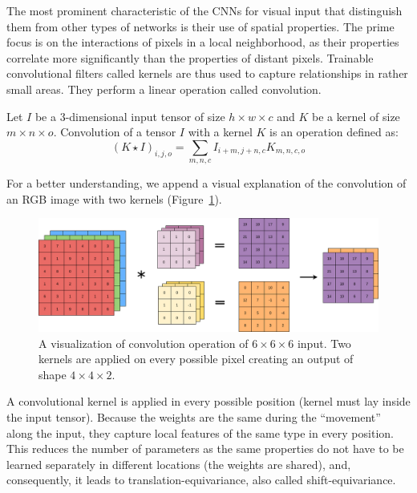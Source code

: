 The most prominent characteristic of the CNNs for visual input that distinguish them from other types of networks is their use of spatial properties. The prime focus is on the interactions of pixels in a local neighborhood, as their properties correlate more significantly than the properties of distant pixels. Trainable convolutional filters called kernels are thus used to capture relationships in rather small areas. They perform a linear operation called convolution.

\begin{defn}[Convolution]\label{def01:7}
	Let $I$ be a 3-dimensional input tensor of size $h \times w \times c$ and $K$ be a kernel of size $m \times n \times o$. Convolution of a tensor $I$ with a kernel $K$ is an operation defined as:
	\begin{equation}
		(K \star I)_{i, j, o} = \sum_{m, n, c} I_{i+m, j+n, c} K_{m, n, c, o}
	\end{equation}
\end{defn}

For a better understanding, we append a visual explanation of the convolution of an RGB image with two kernels (Figure~\ref{img02:conv}).

\begin{figure}[h]\centering
	\includegraphics[width=140mm]{../img/convolution.png}
	\caption{A visualization of convolution operation of $6\times6\times6$ input. Two kernels are applied on every possible pixel creating an output of shape $4\times4\times2$.}
	\label{img02:conv}
\end{figure}

A convolutional kernel is applied in every possible position (kernel must lay inside the input tensor). Because the weights are the same during the “movement” along the input, they capture local features of the same type in every position. This reduces the number of parameters as the same properties do not have to be learned separately in different locations (the weights are shared), and, consequently, it leads to translation-equivariance, also called shift-equivariance.


